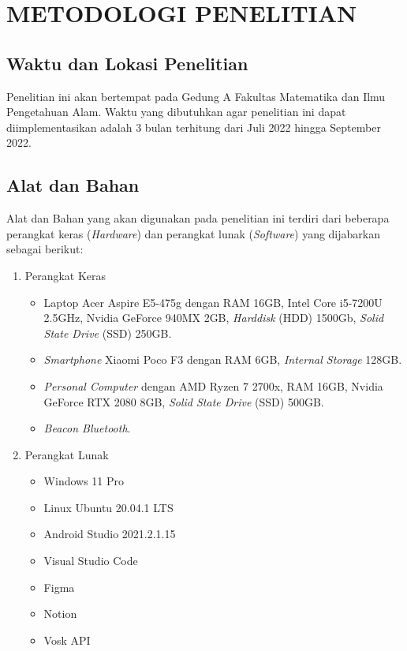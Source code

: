\fancyhf{} 
\fancyfoot[C]{\thepage}
\chapter{METODOLOGI PENELITIAN}

\section{Waktu dan Lokasi Penelitian}
Penelitian ini akan bertempat pada Gedung A Fakultas Matematika dan Ilmu Pengetahuan Alam. Waktu yang dibutuhkan agar penelitian ini dapat diimplementasikan adalah 3 bulan terhitung dari Juli 2022 hingga September 2022.

\section{Alat dan Bahan}
Alat dan Bahan yang akan digunakan pada penelitian ini terdiri dari beberapa perangkat keras (\textit{Hardware}) dan perangkat lunak (\textit{Software}) yang dijabarkan sebagai berikut:

\begin{enumerate}
\item Perangkat Keras
	\begin{itemize}
	\item Laptop Acer Aspire E5-475g dengan RAM 16GB, Intel Core i5-7200U 2.5GHz, Nvidia GeForce 940MX 2GB, \textit{Harddisk} (HDD) 1500Gb, \textit{Solid State Drive} (SSD) 250GB.
	\item \textit{Smartphone} Xiaomi Poco F3 dengan RAM 6GB, \textit{Internal Storage} 128GB.
	\item \textit{Personal Computer} dengan AMD Ryzen 7 2700x, RAM 16GB, Nvidia GeForce RTX 2080 8GB, \textit{Solid State Drive} (SSD) 500GB.
	\item \textit{Beacon Bluetooth}.
	\end{itemize}

\item Perangkat Lunak
	\begin{itemize}
	\item Windows 11 Pro
	\item Linux Ubuntu 20.04.1 LTS
	\item Android Studio 2021.2.1.15
	\item Visual Studio Code
	\item Figma
	\item Notion
	\item Vosk API
	
	\end{itemize}
\end{enumerate}


